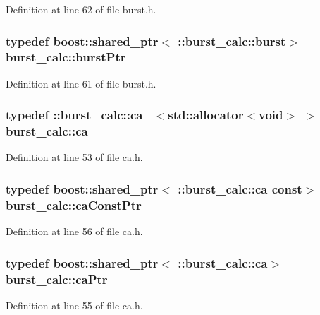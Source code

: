 \-Definition at line 62 of file burst.\-h.

\subsubsection[{burst\-Ptr}]{\setlength{\rightskip}{0pt plus 5cm}typedef boost\-::shared\-\_\-ptr$<$ \-::{\bf burst\-\_\-calc\-::burst}$>$ {\bf burst\-\_\-calc\-::burst\-Ptr}}\label{namespaceburst__calc_abad4c52d5b2edb04f30a49c48ab6eef4}


\-Definition at line 61 of file burst.\-h.

\subsubsection[{ca}]{\setlength{\rightskip}{0pt plus 5cm}typedef \-::{\bf burst\-\_\-calc\-::ca\-\_\-}$<$std\-::allocator$<$void$>$ $>$ {\bf burst\-\_\-calc\-::ca}}\label{namespaceburst__calc_a355facf0d9532ab754dda6738fc4a1df}


\-Definition at line 53 of file ca.\-h.

\subsubsection[{ca\-Const\-Ptr}]{\setlength{\rightskip}{0pt plus 5cm}typedef boost\-::shared\-\_\-ptr$<$ \-::{\bf burst\-\_\-calc\-::ca} const$>$ {\bf burst\-\_\-calc\-::ca\-Const\-Ptr}}\label{namespaceburst__calc_a16f54b8dceeb2f13ea16a0d7d7dbcb02}


\-Definition at line 56 of file ca.\-h.

\subsubsection[{ca\-Ptr}]{\setlength{\rightskip}{0pt plus 5cm}typedef boost\-::shared\-\_\-ptr$<$ \-::{\bf burst\-\_\-calc\-::ca}$>$ {\bf burst\-\_\-calc\-::ca\-Ptr}}\label{namespaceburst__calc_a8be2effd3174a02f4971faa77f739e73}


\-Definition at line 55 of file ca.\-h.

